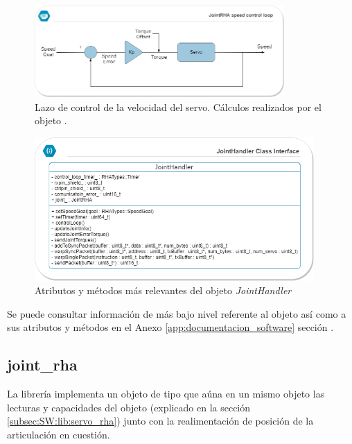         \begin{figure}[H]
        \centering
        \includegraphics[width=0.85\textwidth]{figuras/Imagenes_SW/servo_control_loop.png}   
        \caption{Lazo de control de la velocidad del servo. Cálculos realizados por el objeto .}
        \label{fig:SW:servo_control_loop}
        \end{figure}
            
        \begin{figure}[H]
            \centering
            \includegraphics[width=0.95\textwidth]{figuras/Imagenes_SW/class_diagram_JH.png}   
            \caption{Atributos y métodos más relevantes del objeto \textit{JointHandler}}
            \label{fig:SW:class_diagram_JH}
        \end{figure}
        
        Se puede consultar información de más bajo nivel referente al objeto  así como a sus atributos y métodos en el Anexo \ref{app:documentacion_software} sección \completar.
    
    \subsection{joint\_rha} \label{subsec:SW:lib:joint_rha}
        La librería  implementa un objeto de tipo  que aúna en un mismo objeto las lecturas y capacidades del objeto  (explicado en la sección \ref{subsec:SW:lib:servo_rha}) junto con la realimentación de posición de la articulación en cuestión.
        
